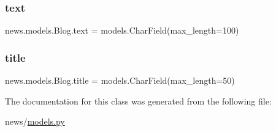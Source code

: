\subsubsection{\texorpdfstring{text}{text}}
{\footnotesize\ttfamily news.\+models.\+Blog.\+text = models.\+Char\+Field(max\+\_\+length=100)\hspace{0.3cm}{\ttfamily [static]}}

\mbox{\label{classnews_1_1models_1_1_blog_a6adf7861b13c6898f5b74d18e91bf8c7}} 
\subsubsection{\texorpdfstring{title}{title}}
{\footnotesize\ttfamily news.\+models.\+Blog.\+title = models.\+Char\+Field(max\+\_\+length=50)\hspace{0.3cm}{\ttfamily [static]}}



The documentation for this class was generated from the following file\+:\begin{DoxyCompactItemize}
\item 
news/\mbox{\hyperlink{models_8py}{models.\+py}}\end{DoxyCompactItemize}
